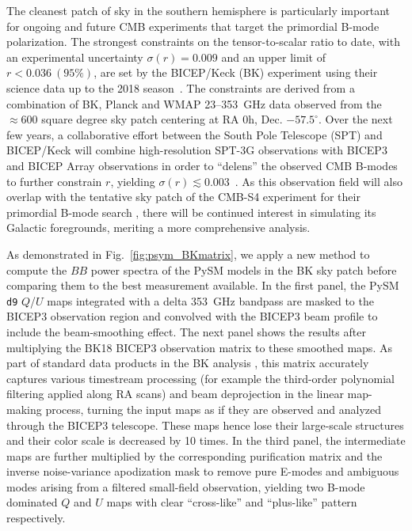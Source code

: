 \documentclass[twocolumn]{aastex631}
\begin{document}
The cleanest patch of sky in the southern hemisphere is particularly important for ongoing and future CMB experiments that target the primordial B-mode polarization. The strongest constraints on the tensor-to-scalar ratio to date, with an experimental uncertainty $\sigma(r) = 0.009$ and an upper limit of $r < 0.036~(95\%)$, are set by the BICEP/Keck (BK) experiment using their science data up to the 2018 season~\citep[``BK18'';][]{Ade:2021}. The constraints are derived from a combination of BK, Planck and WMAP 23--353~GHz data observed from the $\approx 600$ square degree sky patch centering at RA 0h, Dec. $-57.5^{\circ}$. Over the next few years, a collaborative effort between the South Pole Telescope (SPT) and BICEP/Keck will combine high-resolution SPT-3G observations with BICEP3 and BICEP Array observations in order to ``delens'' the observed CMB B-modes to further constrain $r$, yielding $\sigma(r) \lesssim 0.003$~\citep{2022arXiv220316556B}. As this observation field will also overlap with the tentative sky patch of the CMB-S4 experiment for their primordial B-mode search \citep{Abazajian:2022}, there will be continued interest in simulating its Galactic foregrounds, meriting a more comprehensive analysis. 

As demonstrated in Fig.~\ref{fig:psym_BKmatrix}, we apply a new method to compute the $BB$ power spectra of the PySM models in the BK sky patch before comparing them to the best measurement available. In the first panel, the PySM \texttt{d9} $Q$/$U$ maps integrated with a delta 353~GHz bandpass are masked to the BICEP3 observation region and convolved with the BICEP3 beam profile to include the beam-smoothing effect. The next panel shows the results after multiplying the BK18 BICEP3 observation matrix to these smoothed maps. As part of standard data products in the BK analysis \citep{Ade:2016}, this matrix accurately captures various timestream processing (for example the third-order polynomial filtering applied along RA scans) and beam deprojection in the linear map-making process, turning the input maps as if they are observed and analyzed through the BICEP3 telescope. These maps hence lose their large-scale structures and their color scale is decreased by 10 times. In the third panel, the intermediate maps are further multiplied by the corresponding purification matrix and the inverse noise-variance apodization mask to remove pure E-modes and ambiguous modes arising from a
filtered small-field observation, yielding two B-mode dominated $Q$ and $U$ maps with clear ``cross-like'' and ``plus-like'' pattern respectively. 
\end{document}
